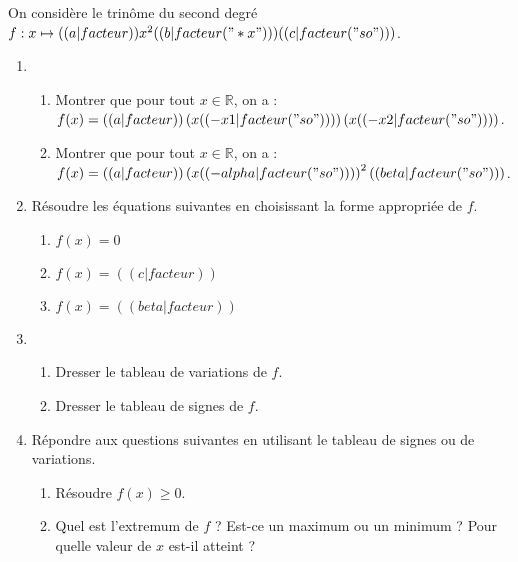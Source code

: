 \exercice
On considère le trinôme du second degré $f: x\mapsto (( a|facteur )) x^2 (( b|facteur("*x") )) (( c|facteur("so") ))$.

\begin{enumerate}
\item
\begin{enumerate}
    \item Montrer que pour tout $x\in\mathbb{R}$, on a : $f(x)=(( a|facteur )) \left( x (( -x1|facteur("so") )) \right) \left( x (( -x2|facteur("so") )) \right) $.
    \item Montrer que pour tout $x\in\mathbb{R}$, on a : $f(x)=(( a|facteur ))\left( x (( -alpha|facteur("so") )) \right)^2 (( beta|facteur("so") ))$.
\end{enumerate}
\item Résoudre les équations suivantes en choisissant la forme appropriée de $f$.
\begin{enumerate}
\item $f(x)=0$
\item $f(x)=(( c|facteur ))$
\item $f(x)=(( beta|facteur ))$
\end{enumerate}
\item
\begin{enumerate}
\item Dresser le tableau de variations de $f$.
\item Dresser le tableau de signes de $f$.
\end{enumerate}
\item Répondre aux questions suivantes en utilisant le tableau de signes ou de variations.
\begin{enumerate}
\item Résoudre $f(x)\geq0$.
\item Quel est l'extremum de $f$ ? Est-ce un maximum ou un minimum ? Pour quelle valeur de $x$ est-il atteint ?
\end{enumerate}
\end{enumerate}
